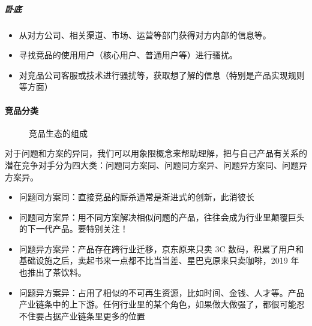 \documentclass[letterpaper,11pt,english]{sphinxmanual}
\begin{document}
\subparagraph{卧底}
\label{\detokenize{chapter_knowledge/goods_analysis:id14}}\begin{itemize}
\item {} 
从对方公司、相关渠道、市场、运营等部门获得对方内部的信息等。

\item {} 
寻找竞品的使用用户（核心用户、普通用户等）进行骚扰。

\item {} 
对竞品公司客服或技术进行骚扰等，获取想了解的信息（特别是产品实现规则等方面）%
\begin{footnote}[454]\sphinxAtStartFootnote
{}
%
\end{footnote}

\end{itemize}


\paragraph{竞品分类}
\label{\detokenize{chapter_knowledge/goods_analysis:id15}}
\begin{figure}[H]
\centering
\capstart

\noindent{}
\caption{竞品生态的组成}\label{\detokenize{chapter_knowledge/goods_analysis:id32}}\end{figure}

对于问题和方案的异同，我们可以用象限概念来帮助理解，把与自己产品有关系的潜在竞争对手分为四大类：问题同方案同、问题同方案异、问题异方案同、问题异方案异。
\begin{itemize}
\item {} 
问题同方案同：直接竞品的厮杀通常是渐进式的创新，此消彼长

\item {} 
问题同方案异：用不同方案解决相似问题的产品，往往会成为行业里颠覆巨头的下一代产品。要特别关注！

\item {} 
问题异方案异：产品存在跨行业迁移，京东原来只卖 3C
数码，积累了用户和基础设施之后，卖起书来一点都不比当当差、星巴克原来只卖咖啡，2019
年也推出了茶饮料。

\item {} 
问题异方案异：占用了相似的不可再生资源，比如时间、金钱、人才等。产品产业链条中的上下游。任何行业里的某个角色，如果做大做强了，都很可能忍不住要占据产业链条里更多的位置

\end{itemize}
\end{document}
